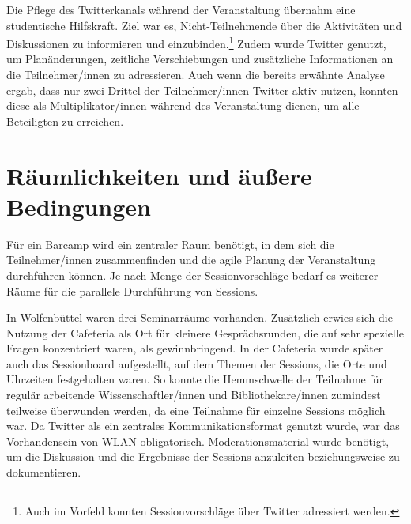 \documentclass[a4paper,
fontsize=11pt,
oneside,
numbers=noperiodatend,
parskip=half-,
bibliography=totoc,
final
]{scrartcl}
\begin{document}
Die Pflege des Twitterkanals während der Veranstaltung übernahm eine
studentische Hilfskraft. Ziel war es, Nicht-Teilnehmende über die
Aktivitäten und Diskussionen zu informieren und einzubinden.\footnote{Auch
  im Vorfeld konnten Sessionvorschläge über Twitter adressiert werden.}
Zudem wurde Twitter genutzt, um Planänderungen, zeitliche Verschiebungen
und zusätzliche Informationen an die Teilnehmer/innen zu adressieren.
Auch wenn die bereits erwähnte Analyse ergab, dass nur zwei Drittel der
Teilnehmer/innen Twitter aktiv nutzen, konnten diese als
Multiplikator/innen während des Veranstaltung dienen, um alle
Beteiligten zu erreichen.

\hypertarget{ruxe4umlichkeiten-und-uxe4uuxdfere-bedingungen}{%
\section{Räumlichkeiten und äußere
Bedingungen}\label{ruxe4umlichkeiten-und-uxe4uuxdfere-bedingungen}}

Für ein Barcamp wird ein zentraler Raum benötigt, in dem sich die
Teilnehmer/innen zusammenfinden und die agile Planung der Veranstaltung
durchführen können. Je nach Menge der Sessionvorschläge bedarf es
weiterer Räume für die parallele Durchführung von Sessions.


In Wolfenbüttel waren drei Seminarräume vorhanden. Zusätzlich erwies
sich die Nutzung der Cafeteria als Ort für kleinere Gesprächsrunden, die
auf sehr spezielle Fragen konzentriert waren, als gewinnbringend. In der
Cafeteria wurde später auch das Sessionboard aufgestellt, auf dem Themen
der Sessions, die Orte und Uhrzeiten festgehalten waren. So konnte die
Hemmschwelle der Teilnahme für regulär arbeitende Wissenschaftler/innen
und Bibliothekare/innen zumindest teilweise überwunden werden, da eine
Teilnahme für einzelne Sessions möglich war. Da Twitter als ein
zentrales Kommunikationsformat genutzt wurde, war das Vorhandensein von
WLAN obligatorisch. Moderationsmaterial wurde benötigt, um die
Diskussion und die Ergebnisse der Sessions anzuleiten beziehungsweise zu
dokumentieren.
\end{document}

